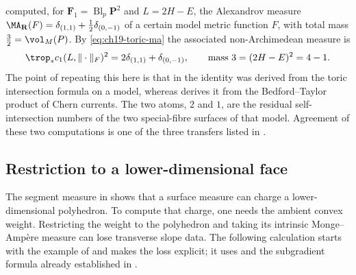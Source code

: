 \begin{example}
\label{ex:ch19-toric-hirzebruch}
 computed, for
$\mathbf F_1=\operatorname{Bl}_p\mathbf P^2$ and $L=2H-E$, the Alexandrov measure
$\MA_{\mathbf R}(F)=\delta_{(1,1)}+\tfrac12\delta_{(0,-1)}$ of a certain
model metric function $F$, with total mass
$\tfrac32=\vol_M(P)$.  By \eqref{eq:ch19-toric-ma} the associated
non-Archimedean measure is
\[
 \trop_*c_1(L,\|\cdot\|_F)^2
 =2\delta_{(1,1)}+\delta_{(0,-1)},
 \qquad\text{mass }3=(2H-E)^2=4-1 .
\]
The point of repeating this here is that in 
the identity was derived from the toric intersection formula on a model,
whereas  derives it from the Bedford--Taylor product
of Chern currents.  The two atoms, $2$ and $1$, are the residual
self-intersection numbers of the two special-fibre surfaces of that model.
Agreement of these two computations is one of the three transfers listed in
.
\end{example}

\subsection{Restriction to a lower-dimensional face}
\label{sec:ch19-toric-lower-face}

The segment measure in  shows that a surface
measure can charge a lower-dimensional polyhedron.  To compute that
charge, one needs the ambient convex weight.  Restricting the weight to
the polyhedron and taking its intrinsic Monge--Amp\`ere measure can lose
transverse slope data.  The following calculation starts with the example
of \cite[Remark~9.8]{Lin26} and makes the loss explicit; it uses
 and the subgradient formula already established
in .

